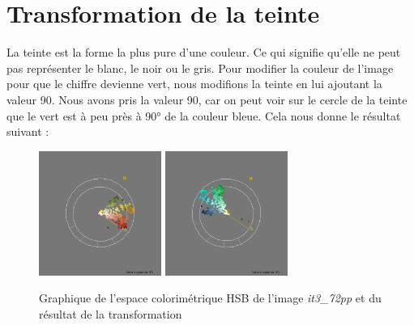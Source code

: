 \documentclass[a4paper,10pt]{article}
\begin{document}
\section{Transformation de la teinte}
La teinte est la forme la plus pure d'une couleur. Ce qui signifie qu'elle ne peut pas représenter le blanc, le noir ou le gris.
Pour modifier la couleur de l'image pour que le chiffre devienne vert, nous modifions la teinte en lui ajoutant la valeur 90.
Nous avons pris la valeur 90, car on peut voir sur le cercle de la teinte que le vert est à peu près à 90° de la couleur bleue.
Cela nous donne le résultat suivant : 
\begin{figure}[!h]
 \begin{center}
 \includegraphics[width=4cm]{resultat/teinte1.png}
 \includegraphics[width=4cm]{resultat/teinte2.png}
 \caption{Graphique de l'espace colorimétrique HSB de l'image \textit{it3\_72pp} et du résultat de la transformation}
 \end{center}
\end{figure}
\end{document}

